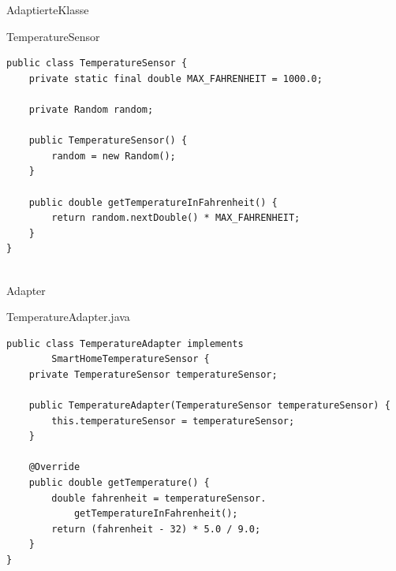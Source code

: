 \begin{frame}[fragile]{AdaptierteKlasse}
	\begin{exampleblock}{TemperatureSensor}
 		\begin{lstlisting}
public class TemperatureSensor {
	private static final double MAX_FAHRENHEIT = 1000.0;
	
	private Random random;
	
	public TemperatureSensor() {
		random = new Random();
	}
	
	public double getTemperatureInFahrenheit() {
		return random.nextDouble() * MAX_FAHRENHEIT;
	}
}
	    
 		\end{lstlisting}
 	\end{exampleblock}
\end{frame}

\begin{frame}[fragile]{Adapter}
	\begin{exampleblock}{TemperatureAdapter.java}
 		\begin{lstlisting}
public class TemperatureAdapter implements
        SmartHomeTemperatureSensor {
	private TemperatureSensor temperatureSensor;

	public TemperatureAdapter(TemperatureSensor temperatureSensor) {
		this.temperatureSensor = temperatureSensor;
	}

	@Override
	public double getTemperature() {
		double fahrenheit = temperatureSensor.
            getTemperatureInFahrenheit();
		return (fahrenheit - 32) * 5.0 / 9.0;
	}
}    
 		\end{lstlisting}
 	\end{exampleblock}
\end{frame}